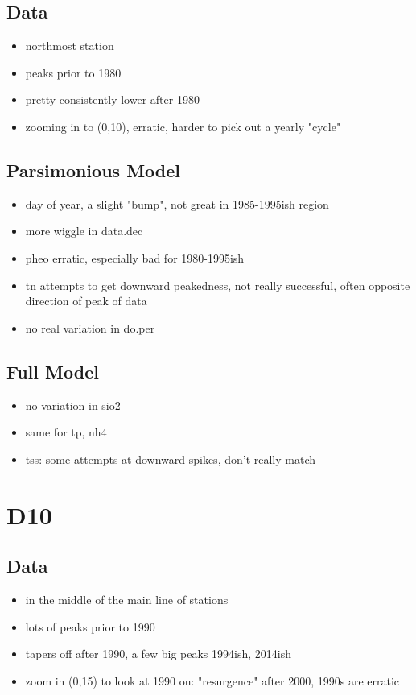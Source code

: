 \documentclass[12pt]{amsart}
\begin{document}
\subsection{Data}
\begin{itemize}
\item northmost station
\item peaks prior to 1980
\item pretty consistently lower after 1980
\item zooming in to (0,10), erratic, harder to pick out a yearly "cycle"
\end{itemize}
\subsection{Parsimonious Model}
\begin{itemize}
\item day of year, a slight "bump", not great in 1985-1995ish region
\item more wiggle in data.dec
\item pheo erratic, especially bad for 1980-1995ish
\item tn attempts to get downward peakedness, not really successful, often opposite direction of peak of data
\item no real variation in do.per
\end{itemize}
\subsection{Full Model}

\begin{itemize}
\item no variation in sio2
\item same for tp, nh4
\item tss: some attempts at downward spikes, don't really match
\end{itemize}

\section{D10}
\subsection{Data}
\begin{itemize}
\item in the middle of the main line of stations
\item lots of peaks prior to 1990
\item tapers off after 1990, a few big peaks 1994ish, 2014ish
\item zoom in (0,15) to look at 1990 on: "resurgence" after 2000, 1990s are erratic
\end{itemize}
\end{document}
